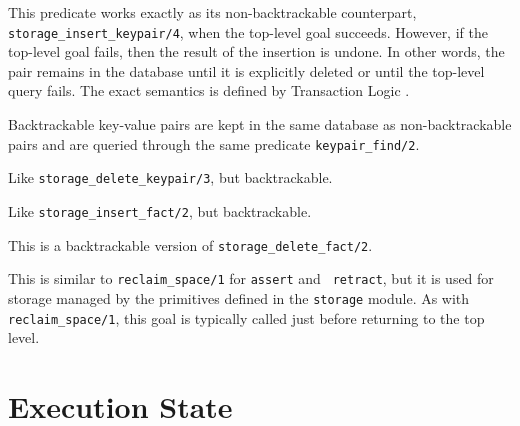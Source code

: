 \begin{description}
This predicate works exactly as its non-backtrackable counterpart,
{\tt storage\_insert\_keypair/4}, when the top-level goal succeeds.
However, if the top-level goal fails, then the result of the insertion is
undone. In other words, the pair remains in the database until it is
explicitly deleted or until the top-level query fails. The exact semantics
is defined by Transaction Logic \cite{BoKi94}.

Backtrackable key-value pairs are kept in the same database as
non-backtrackable pairs and are queried through the same predicate
{\tt keypair\_find/2}.

Like {\tt storage\_delete\_keypair/3}, but backtrackable.


 
Like {\tt storage\_insert\_fact/2}, but backtrackable.

This is a backtrackable version of {\tt storage\_delete\_fact/2}.

 
This is similar to {\tt reclaim\_space/1} for {\tt assert} and {\tt
  retract}, but it is used for storage managed by the primitives defined in
the {\tt storage} module. As with {\tt reclaim\_space/1}, this goal is
typically called just before returning to the top level.
\end{description}



\section{Execution State}\label{environmental}

